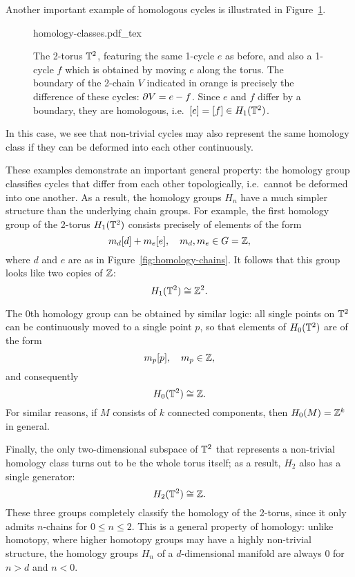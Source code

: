 Another important example of homologous cycles is illustrated in Figure~\ref{fig:homology-classes}.
\begin{figure}[htb!]
	\centering
	\def\svgwidth{.6\linewidth}
	{homology-classes.pdf_tex}
	\caption{The 2-torus $\mathbb{T}^2$, featuring the same 1-cycle $e$ as before, and also a 1-cycle $f$ which is obtained by moving $e$ along the torus. The boundary of the 2-chain $V$ indicated in orange is precisely the difference of these cycles: $\partial V = e - f$. Since $e$ and $f$ differ by a boundary, they are homologous, i.e.\ $[e]=[f]\in H_1(\mathbb{T}^2)$.} %
	\label{fig:homology-classes}
\end{figure}
In this case, we see that non-trivial cycles may also represent the same homology class if they can be deformed into each other continuously.

These examples demonstrate an important general property: the homology group classifies cycles that differ from each other topologically, i.e.\ cannot be deformed into one another. As a result, the homology groups $H_n$ have a much simpler structure than the underlying chain groups. For example, the first homology group of the 2-torus $H_1(\mathbb{T}^2)$ consists precisely of elements of the form
\begin{equation*}
	m_d[d] + m_e[e],\quad m_d,m_e\in G=\mathbb{Z},
\end{equation*}
where $d$ and $e$ are as in Figure~\ref{fig:homology-chains}. It follows that this group looks like two copies of $\mathbb{Z}$:
\begin{equation*}
	H_1(\mathbb{T}^2) \cong \mathbb{Z}^2.
\end{equation*}

The 0th homology group can be obtained by similar logic: all single points on $\mathbb{T}^2$ can be continuously moved to a single point $p$, so that elements of $H_0(\mathbb{T}^2)$ are of the form
\begin{equation*}
	m_p[p],\quad m_p\in\mathbb{Z},
\end{equation*}
and consequently
\begin{equation*}
	H_0(\mathbb{T}^2) \cong \mathbb{Z}.
\end{equation*}
For similar reasons, if $M$ consists of $k$ connected components, then $H_0(M) = \mathbb{Z}^k$ in general.

Finally, the only two-dimensional subspace of $\mathbb{T}^2$ that represents a non-trivial homology class turns out to be the whole torus itself; as a result, $H_2$ also has a single generator:
\begin{equation*}
	H_2(\mathbb{T}^2) \cong \mathbb{Z}.
\end{equation*}
These three groups completely classify the homology of the 2-torus, since it only admits $n$-chains for $0\leq n\leq 2$. This is a general property of homology: unlike homotopy, where higher homotopy groups may have a highly non-trivial structure, the homology groups $H_n$ of a $d$-dimensional manifold are always 0 for $n>d$ and $n<0$.


